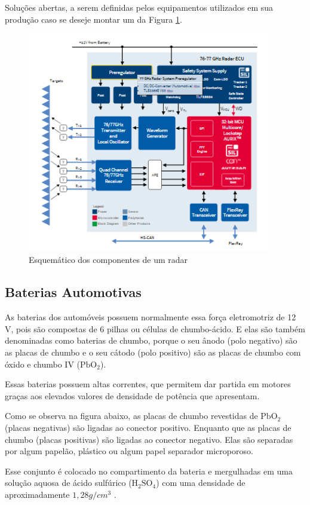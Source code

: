 Soluções abertas, a serem definidas pelos equipamentos utilizados em sua produção caso se deseje montar um da
Figura \ref{fig:esquematico_radar}.
\begin{figure}[h]
  \centering
  \includegraphics[width=400px, scale=1]{figuras/esquematico_radar}
  \caption{Esquemático dos componentes de um radar}
\label{fig:esquematico_radar}
\end{figure}

\subsection{Baterias Automotivas}

As baterias dos automóveis possuem normalmente essa força eletromotriz de 12 V,
pois são compostas de 6 pilhas ou células de chumbo-ácido. E elas são também
denominadas como baterias de chumbo, porque o seu ânodo (polo negativo) são as
placas de chumbo e o seu cátodo (polo positivo) são as placas de chumbo com óxido
 e chumbo IV ($\mathrm{Pb O_2}$).


Essas baterias possuem altas correntes, que permitem dar partida em motores
 graças aos elevados valores de densidade de potência que apresentam.

Como se observa na figura abaixo, as placas de chumbo revestidas de $\mathrm{Pb O_2}$
(placas negativas) são ligadas ao conector positivo. Enquanto que as placas de chumbo
(placas positivas) são ligadas ao conector negativo. Elas são separadas por algum
papelão, plástico ou algum papel separador microporoso.

Esse conjunto é colocado no compartimento da bateria e mergulhadas em uma solução
aquosa de ácido sulfúrico ($\mathrm{H_2 SO_4}$) com uma densidade de
aproximadamente $1,28 g/cm^{3}$	.

